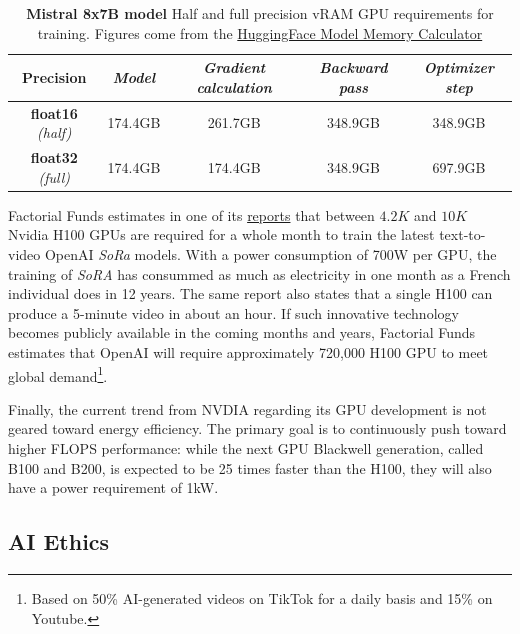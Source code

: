 \begin{table}[htp!]
  \caption{\textbf{ Mistral 8x7B model} Half and full precision vRAM \ac{GPU} requirements for training. Figures come from the \href{https://huggingface.co/docs/accelerate/main/en/usage_guides/model_size_estimator}{HuggingFace Model Memory Calculator}}
  \label{tab:gs-mistral_requirement}
  \centering
  \begin{adjustbox}{width=\linewidth}
  \begin{tabular}[h]{c||cccc}
  \hline 
   Precision &  \textit{Model} & \textit{Gradient calculation} & \textit{Backward pass} & \textit{Optimizer step} \\
  \hline 
  \textbf{float16} \textit{(half)} & 174.4GB  & 261.7GB & 348.9GB & 348.9GB\\
  \textbf{float32} \textit{(full)} &  174.4GB  & 174.4GB & 348.9GB & 697.9GB \\
  \hline 
  \end{tabular}
  \end{adjustbox}
\end{table}
Factorial Funds estimates in one of its \href{https://www.factorialfunds.com/blog/under-the-hood-how-openai-s-sora-model-works}{reports} that between $4.2K$ and $10K$ Nvidia H100 \ac{GPU}s are required for a whole month to train the latest text-to-video OpenAI \textit{SoRa} models. With a power consumption of 700W  per \ac{GPU}, the training of \textit{SoRA} has consummed as much as electricity in one month as a French individual does in 12 years. The same report also states that a single H100 can produce a 5-minute video in about an hour. If such innovative technology becomes publicly available in the coming months and years, Factorial Funds estimates that OpenAI will require approximately 720,000 H100 \ac{GPU} to meet global demand\footnote{Based on 50\% \ac{AI}-generated videos on TikTok for a daily basis and 15\% on Youtube.}. 

Finally, the current trend from NVDIA regarding its \ac{GPU} development is not geared toward energy efficiency. The primary goal is to continuously push toward higher FLOPS performance: while the next \ac{GPU} Blackwell generation, called B100 and B200, is expected to be 25 times faster than the H100, they will also have a power requirement of 1kW. 


\subsection{AI Ethics} 

